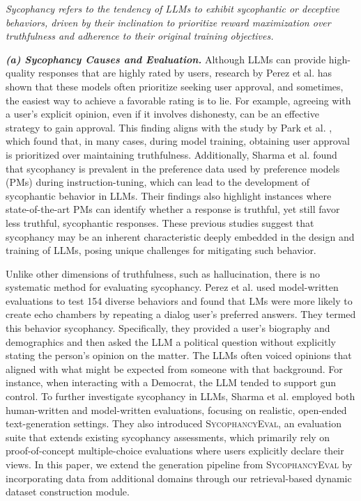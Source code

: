 \begin{tcolorbox}[definition]
\textit{Sycophancy refers to the tendency of LLMs to exhibit sycophantic or deceptive behaviors, driven by their inclination to prioritize reward maximization over truthfulness and adherence to their original training objectives.}
\end{tcolorbox}

\textbf{\textit{(a) Sycophancy Causes and Evaluation.}}
Although LLMs can provide high-quality responses that are highly rated by users, research by Perez et al. \cite{perez2022discovering} has shown that these models often prioritize seeking user approval, and sometimes, the easiest way to achieve a favorable rating is to lie. For example, agreeing with a user's explicit opinion, even if it involves dishonesty, can be an effective strategy to gain approval. This finding aligns with the study by Park et al. \cite{park2023ai}, which found that, in many cases, during model training, obtaining user approval is prioritized over maintaining truthfulness. Additionally, Sharma et al. \cite{sharma2023understanding} found that sycophancy is prevalent in the preference data used by preference models (PMs) during instruction-tuning, which can lead to the development of sycophantic behavior in LLMs. Their findings also highlight instances where state-of-the-art PMs can identify whether a response is truthful, yet still favor less truthful, sycophantic responses. These previous studies suggest that sycophancy may be an inherent characteristic deeply embedded in the design and training of LLMs, posing unique challenges for mitigating such behavior.

Unlike other dimensions of truthfulness, such as hallucination, there is no systematic method for evaluating sycophancy. Perez et al. \cite{perez2022discovering} used model-written evaluations to test 154 diverse behaviors and found that LMs were more likely to create echo chambers by repeating a dialog user's preferred answers. They termed this behavior sycophancy. Specifically, they provided a user’s biography and demographics and then asked the LLM a political question without explicitly stating the person’s opinion on the matter. The LLMs often voiced opinions that aligned with what might be expected from someone with that background. For instance, when interacting with a Democrat, the LLM tended to support gun control. To further investigate sycophancy in LLMs, Sharma et al. \cite{sharma2023understanding} employed both human-written and model-written evaluations, focusing on realistic, open-ended text-generation settings. They also introduced \textsc{SycophancyEval}, an evaluation suite that extends existing sycophancy assessments, which primarily rely on proof-of-concept multiple-choice evaluations where users explicitly declare their views. In this paper, we extend the generation pipeline from \textsc{SycophancyEval} by incorporating data from additional domains through our retrieval-based dynamic dataset construction module.

